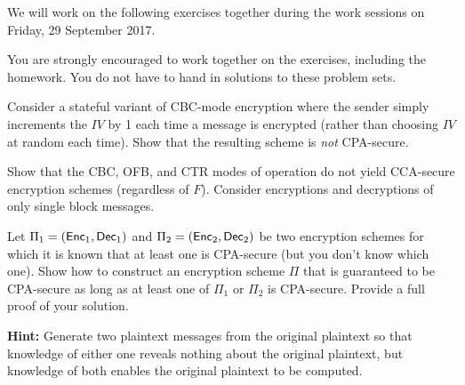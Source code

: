 \documentclass[a4paper,10pt,landscape,twocolumn]{scrartcl}
\newcommand\worksession{Friday, 29 September 2017}
\begin{document}
\problems

{\sffamily\noindent
We will work on the following exercises together during the work sessions on \worksession.

You are strongly encouraged to work together on the exercises, including the homework. You do not have to hand in solutions to these problem sets.}

\begin{exercise}
  Consider a stateful variant of CBC-mode encryption where the sender simply increments the $IV$ by 1 each time a message is encrypted (rather than choosing $IV$ at random each time). Show that the resulting scheme is \emph{not} CPA-secure.
\end{exercise}

\begin{exercise}
Show that the CBC, OFB, and CTR modes of operation do not yield CCA-secure encryption schemes (regardless of $F$). Consider encryptions and decryptions of only single block messages.
\end{exercise}

\begin{exercise}
  Let $\Pi_1 = (\mathsf{Enc}_1, \mathsf{Dec}_1)$ and $\Pi_2 = (\mathsf{Enc}_2, \mathsf{Dec}_2)$ be two encryption schemes for which it is known that at least one is CPA-secure (but you don't know which one). Show how to construct an encryption scheme $\Pi$ that is guaranteed to be CPA-secure as long as at least one of $\Pi_1$ or $\Pi_2$ is CPA-secure. Provide a full proof of your solution.

  \textbf{Hint:} Generate two plaintext messages from the original plaintext so that knowledge of either one reveals nothing about the original plaintext, but knowledge of both enables the original plaintext to be computed.
\end{exercise}
\end{document}
